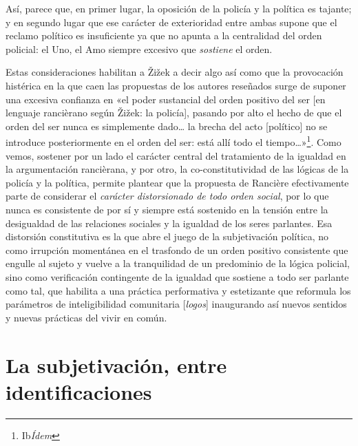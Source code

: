 Así, parece que, en primer lugar, la oposición de la policía y la política es tajante; y en segundo lugar que ese carácter de exterioridad entre ambas supone que el reclamo político es insuficiente ya que no apunta a la centralidad del orden policial: el Uno, el Amo siempre excesivo que \emph{sostiene} el orden.

Estas consideraciones habilitan a Žižek a decir algo así como que la provocación histérica en la que caen las propuestas de los autores reseñados surge de suponer una excesiva confianza en «el poder sustancial del orden positivo del ser {[}en lenguaje rancièrano según Žižek: la policía{]}, pasando por alto el hecho de que el orden del ser nunca es simplemente dado\ldots{} la brecha del acto {[}político{]} no se introduce posteriormente en el orden del ser: está allí todo el tiempo\ldots»\footnote{Ib\emph{Ídem}}. Como vemos, sostener por un lado el carácter central del tratamiento de la igualdad en la argumentación rancièrana, y por otro, la co-constitutividad de las lógicas de la policía y la política, permite plantear que la propuesta de Rancière efectivamente parte de considerar el \emph{carácter distorsionado de todo orden social}, por lo que nunca es consistente de por sí y siempre está sostenido en la tensión entre la desigualdad de las relaciones sociales y la igualdad de los seres parlantes. Esa distorsión constitutiva es la que abre el juego de la subjetivación política, no como irrupción momentánea en el trasfondo de un orden positivo consistente que engulle al sujeto y vuelve a la tranquilidad de un predominio de la lógica policial, sino como verificación contingente de la igualdad que sostiene a todo ser parlante como tal, que habilita a una práctica performativa y estetizante que reformula los parámetros de inteligibilidad comunitaria {[}\emph{logos}{]} inaugurando así nuevos sentidos y nuevas prácticas del vivir en común.

\section{La subjetivación, entre identificaciones}

